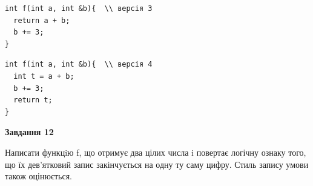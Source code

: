 \documentclass[12pt, ukrainian]{article}
\begin{document}
{\begin {large}
\begin{minipage}[t]{11.0cm}
\vspace{-8mm}\begin{verbatim}
int f(int a, int &b){  \\ версія 3
  return a + b;
  b += 3;
}
\end{verbatim}

\vspace{-8mm}\begin{verbatim}
int f(int a, int &b){  \\ версія 4
  int t = a + b;
  b += 3;
  return t;
}
\end{verbatim}



\begin{center}
\textbf{Завдання 12}
\end{center}

Написати функцiю f, що отримує два цілих числа i повертає логічну ознаку того, що їх дев'ятковий запис закінчується на одну ту саму цифру. Стиль запису умови також оцінюється.\par

\end{minipage}

\end {large}}
\newpage
\end{document}
